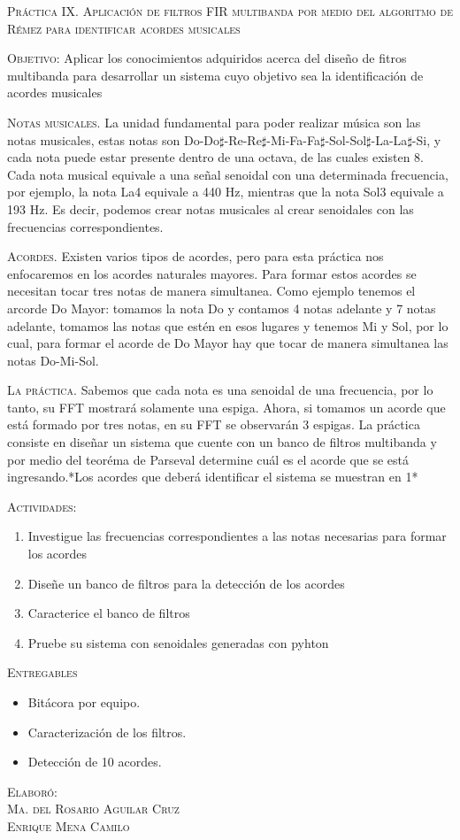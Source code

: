 \documentclass[10pt,letterpaper,spanish,twoside]{report}
\begin{document}
\docdate

\begin{center}
\textsc{\asignatura}\vspace{.2em}
\end{center}

\textsc{Práctica IX. Aplicación de filtros FIR multibanda por medio del algoritmo de Rémez para identificar acordes musicales}

\textsc{Objetivo:} Aplicar los conocimientos adquiridos acerca del diseño de fitros multibanda para desarrollar un sistema cuyo objetivo sea la identificación de acordes musicales

\textsc{Notas musicales.} La unidad fundamental para poder realizar música son las notas musicales, estas notas son Do-Do$\sharp$-Re-Re$\sharp$-Mi-Fa-Fa$\sharp$-Sol-Sol$\sharp$-La-La$\sharp$-Si, y cada nota puede estar presente dentro de una octava, de las cuales existen 8. Cada nota musical equivale a una señal senoidal con una determinada frecuencia, por ejemplo, la nota La4 equivale a 440 Hz, mientras que la nota Sol3 equivale a 193 Hz. Es decir, podemos crear notas musicales al crear senoidales con las frecuencias correspondientes.

\textsc{Acordes.} Existen varios tipos de acordes, pero para esta práctica nos enfocaremos en los acordes naturales mayores. Para formar estos acordes se necesitan tocar tres notas de manera simultanea. Como ejemplo tenemos el arcorde Do Mayor: tomamos la nota Do y contamos 4 notas adelante y 7 notas adelante, tomamos las notas que estén en esos lugares y tenemos Mi y Sol, por lo cual, para formar el acorde de Do Mayor hay que tocar de manera simultanea las notas Do-Mi-Sol.

\textsc{La práctica.} Sabemos que cada nota es una senoidal de una frecuencia, por lo tanto, su FFT mostrará solamente una espiga. Ahora, si tomamos un acorde que está formado por tres notas, en su FFT se observarán 3 espigas. La práctica consiste en diseñar un sistema que cuente con un banco de filtros multibanda y por medio del teoréma de Parseval determine cuál es el acorde que se está ingresando.*Los acordes que deberá identificar el sistema se muestran en 1*

\textsc{Actividades:}
\begin{enumerate}
  \item Investigue las frecuencias correspondientes a las notas necesarias para formar los acordes
  \item Diseñe un banco de filtros para la detección de los acordes
  \item Caracterice el banco de filtros
  \item Pruebe su sistema con senoidales generadas con pyhton
\end{enumerate}

\textsc{Entregables}
\begin{itemize}
  \item Bitácora por equipo.
  \item Caracterización de los filtros.
  \item Detección de 10 acordes.
\end{itemize}

\vfill
\begin{flushright}
\textsc{Elaboró:\\
Ma. del Rosario Aguilar Cruz\\
Enrique Mena Camilo}
\end{flushright}
\end{document}
